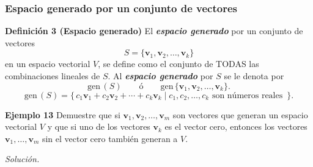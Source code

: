 {\nologo
\begin{frame}\frametitle{Espacio generado por un conjunto de vectores}
	
	\vspace{-2mm}
	\begin{block}{\textbf{Definición 3 (Espacio generado)}}
		\justifying
		El \textbf{\textit{espacio generado}} por un conjunto de vectores 
		\[
		S=\{\mathbf{v}_1,\mathbf{v}_2,\hdots,\mathbf{v}_k\}
		\]
		en un espacio vectorial $V$, se define como el conjunto de TODAS las combinaciones lineales de $S$.
		Al \textbf{\textit{espacio generado}} por $S$ se le denota por 
		\[
		\text{gen}\,(S) \qquad \text{ó} \qquad \text{gen}\, \{\mathbf{v}_1,\mathbf{v}_2,\hdots,\mathbf{v}_k\}.
		\]
		\[
		\text{gen}\,(S) = \Big\{ \, c_1\mathbf{v}_1 + c_2\mathbf{v}_2 + \cdots + c_k\mathbf{v}_k \mid c_1, c_2,\hdots,c_k  
		\text{ son números reales } \, \Big\}.
		\]
	\end{block}
	
	\begin{ej}{\textbf{Ejemplo 13}} \justifying
		Demuestre que si $\mathbf{v}_1,\mathbf{v}_2,\hdots,\mathbf{v}_m$ son vectores que generan un espacio vectorial $V$ y que si uno de los vectores $\mathbf{v}_k$ es el vector cero, entonces los vectores $\mathbf{v}_1,\hdots,\mathbf{v}_m$ sin el vector cero también generan a $V$.
	\end{ej}
	\textit{Solución.}
	
\end{frame}
}
